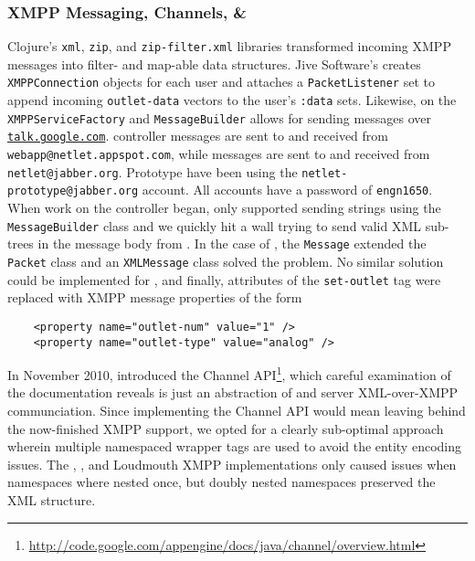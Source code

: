 \subsubsection{XMPP Messaging, \aengn Channels, \& \jsmack} 
Clojure's \texttt{xml}, \texttt{zip}, and \texttt{zip-filter.xml} libraries transformed incoming XMPP messages into filter- and map-able data structures. Jive Software's \smack creates \java \texttt{XMPPConnection} objects for each user and attaches a \texttt{PacketListener} set to append incoming \texttt{outlet-data} vectors to the user's \texttt{:data} sets.  Likewise, on \gae the \texttt{XMPPServiceFactory} and \texttt{MessageBuilder} allows for sending messages over \texttt{\url{talk.google.com}}.  \aengn controller messages are sent to and received from \texttt{webapp@netlet.appspot.com}, while \smack messages are sent to and received from \texttt{netlet@jabber.org}.  Prototype \netlets have been using the \texttt{netlet-prototype@jabber.org} account.  All accounts have a password of \texttt{engn1650}.\\


When work on the \clojure controller began, \gae only supported sending strings using the \texttt{MessageBuilder} class and we quickly hit a wall trying to send valid XML sub-trees in the message body from \aengn. In the case of \jsmack, the \texttt{Message} extended the \texttt{Packet} class and an \texttt{XMLMessage} class solved the problem.  No similar solution could be implemented for \aengn, and finally, attributes of the \texttt{set-outlet} tag were replaced with XMPP message properties of the form
\begin{verbatim}
    <property name="outlet-num" value="1" />
    <property name="outlet-type" value="analog" />
\end{verbatim}

In November 2010, \gae introduced the Channel API\footnote{\url{http://code.google.com/appengine/docs/java/channel/overview.html}}, which careful examination of the documentation reveals is just an abstraction of \js and server XML-over-XMPP communciation.  Since implementing the Channel API would mean leaving behind the now-finished \aengn XMPP support, we opted for a clearly sub-optimal approach wherein multiple namespaced wrapper tags are used to avoid the entity encoding issues. The \smack, \aengn, and Loudmouth XMPP implementations only caused issues when namespaces where nested once, but doubly nested namespaces preserved the XML structure.\\

